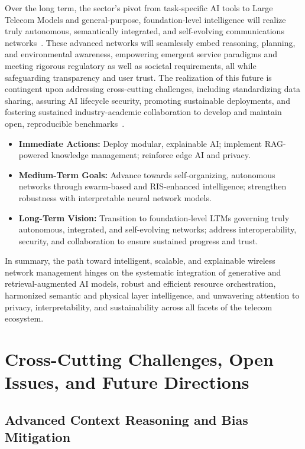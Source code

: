 \documentclass[sigconf]{acmart}
\begin{document}
Over the long term, the sector's pivot from task-specific AI tools to Large Telecom Models and general-purpose, foundation-level intelligence will realize truly autonomous, semantically integrated, and self-evolving communications networks~\cite{ref16, ref20, ref46, ref49}. These advanced networks will seamlessly embed reasoning, planning, and environmental awareness, empowering emergent service paradigms and meeting rigorous regulatory as well as societal requirements, all while safeguarding transparency and user trust. The realization of this future is contingent upon addressing cross-cutting challenges, including standardizing data sharing, assuring AI lifecycle security, promoting sustainable deployments, and fostering sustained industry-academic collaboration to develop and maintain open, reproducible benchmarks~\cite{ref16, ref46, ref49}.

\begin{itemize}
    \item \textbf{Immediate Actions:} Deploy modular, explainable AI; implement RAG-powered knowledge management; reinforce edge AI and privacy.
    \item \textbf{Medium-Term Goals:} Advance towards self-organizing, autonomous networks through swarm-based and RIS-enhanced intelligence; strengthen robustness with interpretable neural network models.
    \item \textbf{Long-Term Vision:} Transition to foundation-level LTMs governing truly autonomous, integrated, and self-evolving networks; address interoperability, security, and collaboration to ensure sustained progress and trust.
\end{itemize}

In summary, the path toward intelligent, scalable, and explainable wireless network management hinges on the systematic integration of generative and retrieval-augmented AI models, robust and efficient resource orchestration, harmonized semantic and physical layer intelligence, and unwavering attention to privacy, interpretability, and sustainability across all facets of the telecom ecosystem.

\section{Cross-Cutting Challenges, Open Issues, and Future Directions}

\subsection{Advanced Context Reasoning and Bias Mitigation}
\end{document}
